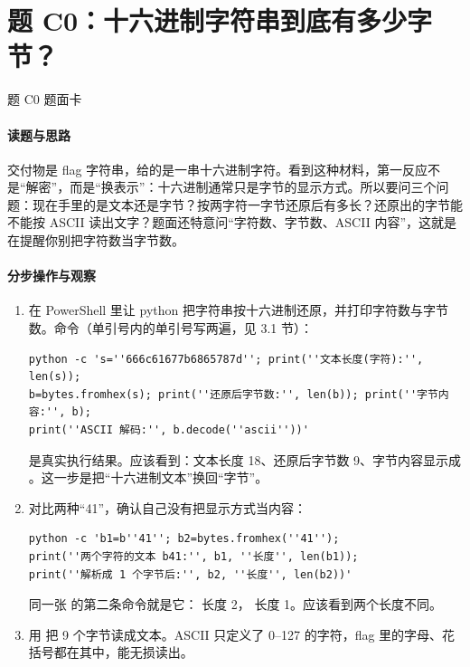 \documentclass[UTF8,12pt,oneside]{ctexbook}
\begin{document}
\section{题 C0：十六进制字符串到底有多少字节？}

\begin{challenge}{题 C0 题面卡}
\end{challenge}

\paragraph{读题与思路}交付物是 flag 字符串，给的是一串十六进制字符。看到这种材料，第一反应不是“解密”，而是“换表示”：十六进制通常只是字节的显示方式。所以要问三个问题：现在手里的是文本还是字节？按两字符一字节还原后有多长？还原出的字节能不能按 ASCII 读出文字？题面还特意问“字符数、字节数、ASCII 内容”，这就是在提醒你别把字符数当字节数。

\paragraph{分步操作与观察}
\begin{enumerate}[label=\arabic*.]
\item 在 PowerShell 里让 python 把字符串按十六进制还原，并打印字符数与字节数。命令（单引号内的单引号写两遍，见 3.1 节）：
\begin{lstlisting}
python -c 's=''666c61677b6865787d''; print(''文本长度(字符):'', len(s));
b=bytes.fromhex(s); print(''还原后字节数:'', len(b)); print(''字节内容:'', b);
print(''ASCII 解码:'', b.decode(''ascii''))'
\end{lstlisting}
 是真实执行结果。应该看到：文本长度 18、还原后字节数 9、字节内容显示成 。这一步是把“十六进制文本”换回“字节”。
\item 对比两种“41”，确认自己没有把显示方式当内容：
\begin{lstlisting}
python -c 'b1=b''41''; b2=bytes.fromhex(''41'');
print(''两个字符的文本 b41:'', b1, ''长度'', len(b1));
print(''解析成 1 个字节后:'', b2, ''长度'', len(b2))'
\end{lstlisting}
同一张  的第二条命令就是它： 长度 2， 长度 1。应该看到两个长度不同。
\item 用  把 9 个字节读成文本。ASCII 只定义了 0--127 的字符，flag 里的字母、花括号都在其中，能无损读出。
\end{enumerate}
\end{document}
